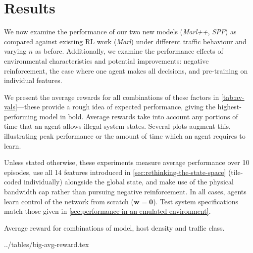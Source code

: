 \documentclass[conference, a4paper, 10pt, times]{IEEEtran}
\newcommand{\wvec}[1]{\ensuremath{\bm{w}_{#1}}}
\begin{document}


\section{Results}
\label{sec:the-results-of-doing-so}

We now examine the performance of our two new models (\emph{Marl++}, \emph{SPF}) as compared against existing RL work (\emph{Marl}) under different traffic behaviour and varying $n$ as before.
Additionally, we examine the performance effects of environmental characteristics and potential improvements: negative reinforcement, the case where one agent makes all decisions, and pre-training on individual features.

We present the average rewards for all combinations of these factors in \cref{tab:av-vals}---these provide a rough idea of expected performance, giving the highest-performing model in bold.
Average rewards take into account any portions of time that an agent allows illegal system states.
Several plots augment this, illustrating peak performance or the amount of time which an agent requires to learn.

Unless stated otherwise, these experiments measure average performance over 10 episodes, use all \num{14} features introduced in \cref{sec:rethinking-the-state-space} (tile-coded individually) alongside the global state, and make use of the physical bandwidth cap rather than pursuing negative reinforcement.
In all cases, agents learn control of the network from scratch ($\wvec{}=\bm{0}$).
Test system specifications match those given in \cref{sec:performance-in-an-emulated-environment}.

\begin{table}
	\centering
	\caption{Average reward for combinations of model, host density and traffic class.\label{tab:av-vals}}
	
	\expandableinput ../tables/big-avg-reward.tex
\end{table}
\end{document}
